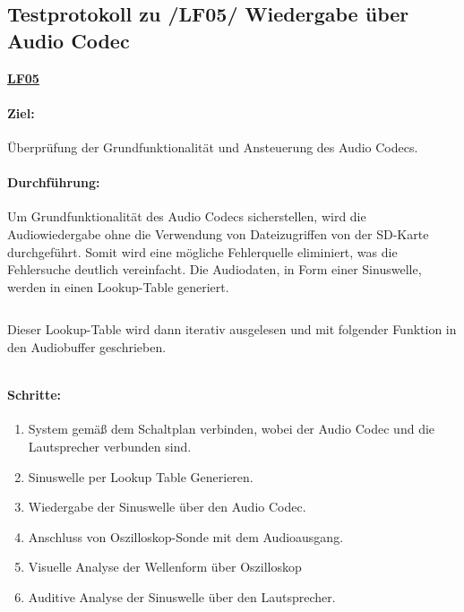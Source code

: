 \subsection{Testprotokoll zu /LF05/ Wiedergabe über Audio Codec}
\label{test-audiocodec}

\textbf{\hyperlink{lf-audioplayback}{LF05}}

\paragraph{Ziel:}
Überprüfung der Grundfunktionalität und Ansteuerung des Audio Codecs.

\paragraph{Durchführung:}

Um Grundfunktionalität des Audio Codecs sicherstellen, wird die Audiowiedergabe ohne die Verwendung von Dateizugriffen von der SD-Karte durchgeführt. 
Somit wird eine mögliche Fehlerquelle eliminiert, was die Fehlersuche deutlich vereinfacht. 
Die Audiodaten, in Form einer Sinuswelle, werden in einen Lookup-Table generiert. 

\inputminted[firstline=15, lastline=19]{c}{../../f401_sd_card_audio_codec_test/Core/Src/audio.c}

Dieser Lookup-Table wird dann iterativ ausgelesen und mit folgender Funktion in den Audiobuffer geschrieben.

\inputminted[firstline=55, lastline=77]{c}{../../f401_sd_card_audio_codec_test/Core/Src/audio.c}

\newpage
\paragraph{Schritte:}
\begin{enumerate}
	\item System gemäß dem Schaltplan verbinden, wobei der Audio Codec und die Lautsprecher verbunden sind.
	\item Sinuswelle per Lookup Table Generieren. 
	\item Wiedergabe der Sinuswelle über den Audio Codec.
	\item Anschluss von Oszilloskop-Sonde mit dem Audioausgang.
	\item Visuelle Analyse der Wellenform über Oszilloskop
	\item Auditive Analyse der Sinuswelle über den Lautsprecher.
\end{enumerate}

